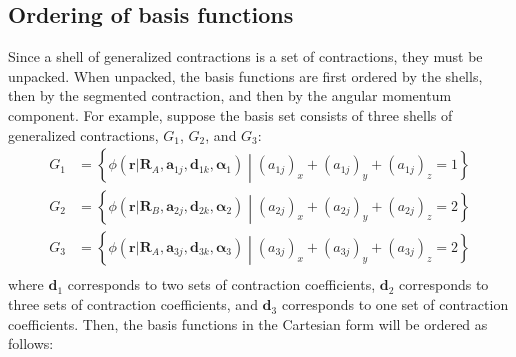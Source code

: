 \documentclass[letterpaper]{article}
\begin{document}
\subsection{Ordering of basis functions}
\label{sec:basis_ordering}
Since a shell of generalized contractions is a set of contractions, they must be
unpacked.
When unpacked, the basis functions are first ordered by the shells, then by the
segmented contraction, and then by the angular momentum component.
For example, suppose the basis set consists of three shells of generalized
contractions, $G_1$, $G_2$, and $G_3$:
\begin{equation}
  \begin{split}
    G_1 &= \left\{
      \phi (\mathbf{r} | \mathbf{R}_{A}, \mathbf{a}_{1j}, \mathbf{d}_{1k}, \boldsymbol{\alpha}_1)
      \middle|
      (a_{1j})_x + (a_{1j})_y + (a_{1j})_z = 1
    \right\}\\
    G_2 &= \left\{
      \phi (\mathbf{r} | \mathbf{R}_{B}, \mathbf{a}_{2j}, \mathbf{d}_{2k}, \boldsymbol{\alpha}_2)
      \middle|
      (a_{2j})_x + (a_{2j})_y + (a_{2j})_z = 2
    \right\}\\
    G_3 &= \left\{
      \phi (\mathbf{r} | \mathbf{R}_{A}, \mathbf{a}_{3j}, \mathbf{d}_{3k}, \boldsymbol{\alpha}_3)
      \middle|
      (a_{3j})_x + (a_{3j})_y + (a_{3j})_z = 2
    \right\}\\
  \end{split}
\end{equation}
where $\mathbf{d}_1$ corresponds to two sets of contraction coefficients,
$\mathbf{d}_2$ corresponds to three sets of contraction coefficients,
and $\mathbf{d}_3$ corresponds to one set of contraction coefficients.
Then, the basis functions in the Cartesian form will be ordered as follows:
\end{document}
